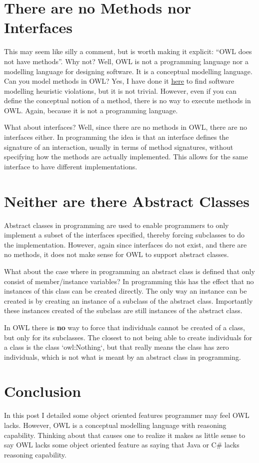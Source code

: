 \documentclass{amsart}
\begin{document}
  
  \section{There are no Methods nor Interfaces}
  This may seem like silly a comment, but is worth making it explicit: ``OWL does not have methods''. Why not? Well, OWL is not a programming language nor a modelling language for designing software. It is a conceptual modelling language. Can you model methods in OWL? Yes, I have done it \href{https://henrietteharmse.files.wordpress.com/2017/09/scenariotestingusingowl_v0-1-7-final.pdf}{here} to find software modelling heuristic violations, but it is not trivial. However, even if you can define the conceptual notion of a method, there is no way to execute methods in OWL. Again, because it is not a programming language.
  
  What about interfaces? Well, since there are no methods in OWL, there are no interfaces either. In programming the idea is that an interface defines the signature of an interaction, usually in terms of method signatures, without specifying how the methods are actually implemented. This allows for the same interface to have different implementations. 
  
  \section{Neither are there Abstract Classes}
  Abstract classes in programming are used to enable programmers to only implement a subset of the interfaces specified, thereby forcing subclasses to do the implementation. However, again since interfaces do not exist, and there are no methods, it does not make sense for OWL to support abstract classes.
  
  What about the case where in programming an abstract class is defined that only consist of member/instance variables? In programming this has the effect that no instances of this class can be created directly. The only way an instance can be created is by creating an instance of a subclass of the abstract class. Importantly these instances created of the subclass are still instances of the abstract class. 
  
  In OWL there is \textbf{no} way to force that individuals cannot be created of a class, but only for its subclasses. The closest to not being able to create individuals for a class is the class `owl:Nothing`, but that really means the class has zero individuals, which is not what is meant by an abstract class in programming. 
  
  \section{Conclusion}  
  In this post I detailed some object oriented features programmer may feel OWL lacks. However, OWL is a conceptual modelling language with reasoning capability. Thinking about that causes one to realize it makes as little sense to say OWL lacks some object oriented feature as saying that Java or C\# lacks reasoning capability. 
  
  
  
  
  
 
\end{document}
